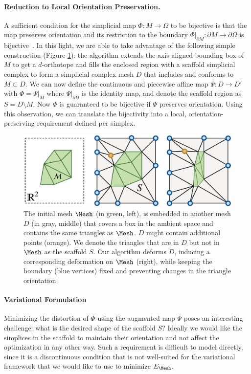 \paragraph{Reduction to Local Orientation Preservation.}  A sufficient %
condition for the simplicial map 
$\Phi: M\rightarrow \Omega $ to be bijective is that the map preserves orientation and its restriction to the boundary $\Phi|_{\partial M} : \partial M \rightarrow \partial \Omega$ is bijective~\cite{Lipman:2013ArXiv}. In this light, we are able to take advantage of the following simple construction (Figure \ref{scaf:fig:construction}): the algorithm extends the axis aligned bounding box of $M$ to get a $d$-orthotope and fills the enclosed region with a scaffold simplicial complex to form a simplicial complex mesh $D$ that includes and conforms to $M \subset D$. We can now define the continuous and piecewise affine map $\Psi : D \rightarrow D'$ with $\Phi = \Psi |_{M}$ where $\Psi|_{\partial D}$ is the identity map, and denote the scaffold region as $S = D\setminus M$. Now $\Phi$ is guaranteed to be bijective if $\Psi$ preserves orientation. Using this observation, we can translate the bijectivity into a local, orientation-preserving requirement defined per simplex.

\begin{figure}[h!]
\centering
    \includegraphics[width = \columnwidth]{figs/scaffold_illustration}
\caption{The initial mesh $\Mesh$ (in green, left), is embedded in another mesh $D$ (in gray, middle) that covers a box in the ambient space and contains the same triangles as $\Mesh$. $D$ might contain additional points (orange). We denote the triangles that are in $D$ but not in $\Mesh$ as the scaffold $S$. Our algorithm deforms $D$, inducing a corresponding deformation on $\Mesh$ (right), while keeping the boundary (blue vertices) fixed and preventing changes in the triangle orientation.}
\label{scaf:fig:construction}
\end{figure}


 \paragraph{Variational Formulation} 
 Minimizing the distortion of $\Phi$ using the augmented map $\Psi$ poses an interesting challenge: what is the desired shape of the scaffold $S$? Ideally we would like the simplices in the scaffold to maintain their orientation and not affect the optimization in any other way. Such a requirement is difficult to model directly, since it is a discontinuous condition that is not well-suited for the variational framework that we would like to use to minimize $E_{\Mesh}$. 
 
